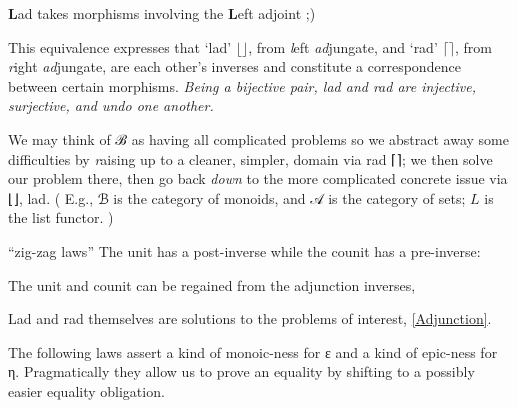 \documentclass[11pt]{article}
\begin{document}
{\textbf L}ad takes morphisms involving the {\textbf L}eft adjoint ;)

\room

This equivalence expresses that `lad' \(⌊⌋\), from \emph{l}eft \emph{ad}jungate,
and `rad' \(⌈⌉\), from \emph{r}ight \emph{ad}jungate, are each other's inverses
and constitute a correspondence between certain morphisms.
\emph{Being a bijective pair, lad and rad are injective, surjective, and undo one another.}

\room

We may think of ℬ as having all complicated problems so we abstract
away some difficulties by \emph{r}aising up to a cleaner, simpler, domain
via rad ⌈⌉; we then solve our problem there, then go back \emph{down} to
the more complicated concrete issue via ⌊⌋, lad.
\newline
( E.g., ℬ is the category of monoids, and 𝒜 is the category of sets; \(L\) is the list functor. )

\begineqns


\vspace{2ex}
“zig-zag laws” The unit has a post-inverse while the counit has a pre-inverse:



\vspace{2ex}
The unit and counit can be regained from the adjunction inverses,



\vspace{2ex}
Lad and rad themselves are solutions to the problems of interest, \eqref{Adjunction}.



\vspace{2ex}
The following laws assert a kind of
monoic-ness for ε and a kind of epic-ness for η.
Pragmatically they allow us to prove an equality
by shifting to a possibly easier equality obligation.


\end{document}
